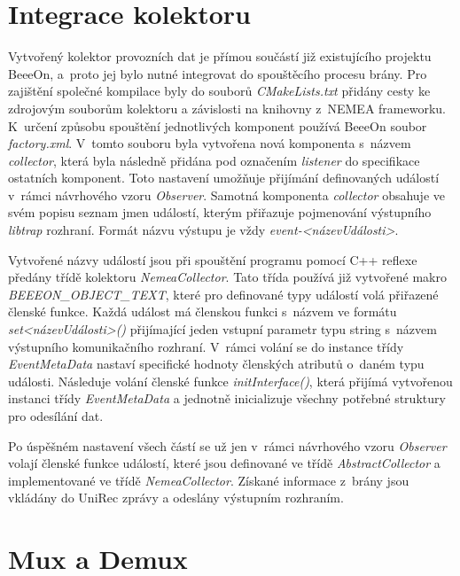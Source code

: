 
\section{Integrace kolektoru}    
     Vytvořený kolektor provozních dat je přímou součástí již existujícího projektu BeeeOn, a~proto jej bylo nutné 
     integrovat do spouštěcího procesu brány. Pro zajištění společné kompilace byly do souborů 
     \textit{CMakeLists.txt} přidány cesty ke zdrojovým souborům kolektoru a závislosti na knihovny
     z~NEMEA frameworku. K~určení způsobu spouštění jednotlivých komponent používá BeeeOn
     soubor \textit{factory.xml}. V~tomto souboru byla vytvořena nová komponenta s~názvem 
     \textit{collector}, 
     která byla následně přidána pod označením \textit{listener} do specifikace ostatních komponent.
     Toto nastavení 
     umožňuje přijímání definovaných událostí v~rámci návrhového vzoru \textit{Observer}.
     Samotná komponenta \textit{collector}
     obsahuje ve svém popisu seznam jmen událostí, kterým přiřazuje pojmenování výstupního \textit{libtrap}
     rozhraní. Formát názvu výstupu je vždy \textit{event-<názevUdálosti>}. 
     
     Vytvořené názvy událostí jsou při spouštění programu pomocí C++ reflexe předány třídě kolektoru
     \textit{NemeaCollector}. Tato třída používá již vytvořené makro \textit{BEEEON\_OBJECT\_TEXT},
     které pro definované 
     typy událostí volá přiřazené členské funkce. Každá událost má členskou funkci s~názvem ve formátu 
     \textit{set<názevUdálosti>()} přijímající jeden vstupní parametr typu string s~názvem výstupního 
     komunikačního rozhraní. V~rámci volání se do instance třídy \textit{EventMetaData}
     nastaví specifické hodnoty členských
     atributů o~daném typu události. Následuje volání členské funkce \textit{initInterface()},
     která přijímá vytvořenou instanci třídy  \textit{EventMetaData} a
     jednotně inicializuje všechny potřebné struktury pro odesílání dat.
     
     Po úspěšném nastavení všech částí se už jen v~rámci návrhového vzoru \textit{Observer} volají
     členské funkce událostí, které jsou definované ve třídě \textit{AbstractCollector} a implementované
     ve třídě \textit{NemeaCollector}. Získané informace z~brány jsou vkládány do UniRec zprávy a odeslány
     výstupním rozhraním.
     
\section{Mux a Demux}    

